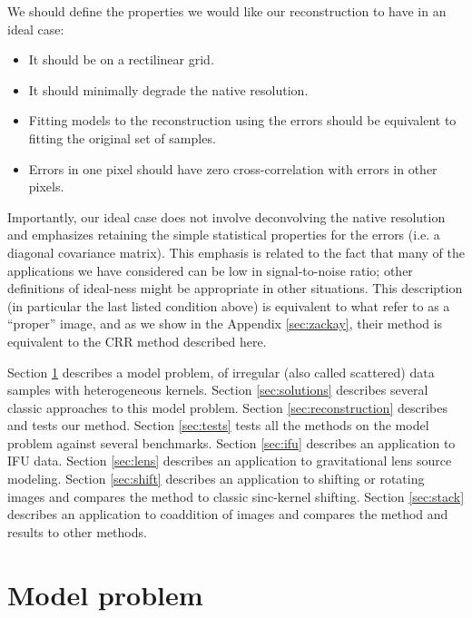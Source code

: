 \documentclass[twocolumn,tighten]{aastex61}
\begin{document}
We should define the properties we would like our reconstruction to
have in an ideal case:
\begin{itemize}
\item It should be on a rectilinear grid.
\item It should minimally degrade the native resolution.
\item Fitting models to the reconstruction using the errors should be
  equivalent to fitting the original set of samples.
\item Errors in one pixel should have zero cross-correlation with
  errors in other pixels.
\end{itemize}
Importantly, our ideal case does not involve deconvolving the native
resolution and emphasizes retaining the simple statistical properties
for the errors (i.e. a diagonal covariance matrix). This emphasis is
related to the fact that many of the applications we have considered
can be low in signal-to-noise ratio; other definitions of ideal-ness
might be appropriate in other situations. This description (in
particular the last listed condition above) is equivalent to what
\citet{zackay17a} refer to as a ``proper'' image, and as we show in
the Appendix \ref{sec:zackay}, their method is equivalent to the CRR
method described here.

Section \ref{sec:model} describes a model problem, of irregular (also
called scattered) data samples with heterogeneous kernels. Section
\ref{sec:solutions} describes several classic approaches to this model
problem. Section \ref{sec:reconstruction} describes and tests our
method. Section \ref{sec:tests} tests all the methods on the model
problem against several benchmarks. Section \ref{sec:ifu} describes an
application to IFU data.  Section \ref{sec:lens} describes an
application to gravitational lens source modeling.  Section
\ref{sec:shift} describes an application to shifting or rotating
images and compares the method to classic sinc-kernel
shifting. Section \ref{sec:stack} describes an application to
coaddition of images and compares the method and results to other
methods.

\section{Model problem}
\label{sec:model}
\end{document}
